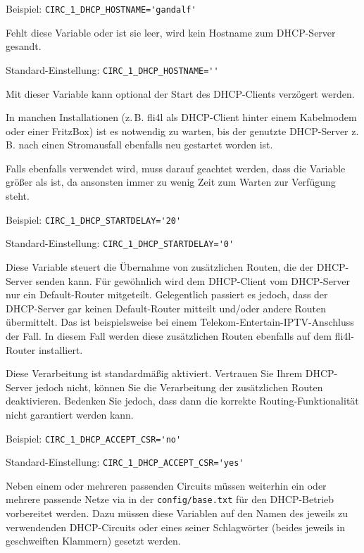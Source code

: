 \begin{description}
Beispiel: \verb+CIRC_1_DHCP_HOSTNAME='gandalf'+

Fehlt diese Variable oder ist sie leer, wird kein Hostname zum DHCP-Server
gesandt.

Standard-Einstellung: \verb+CIRC_1_DHCP_HOSTNAME=''+


Mit dieser Variable kann optional der Start des DHCP-Clients verzögert werden.

In manchen Installationen (z.\,B. fli4l als DHCP-Client hinter einem Kabelmodem
oder einer FritzBox) ist es notwendig zu warten, bis der genutzte DHCP-Server
z.\,B. nach einen Stromausfall ebenfalls neu gestartet worden ist.

Falls  ebenfalls verwendet wird, muss darauf geachtet werden,
dass die Variable  größer als 
ist, da ansonsten immer zu wenig Zeit zum Warten zur Verfügung steht.

Beispiel: \verb+CIRC_1_DHCP_STARTDELAY='20'+

Standard-Einstellung: \verb+CIRC_1_DHCP_STARTDELAY='0'+


Diese Variable steuert die Übernahme von zusätzlichen Routen, die der
DHCP-Server senden kann. Für gewöhnlich wird dem DHCP-Client vom DHCP-Server
nur ein Default-Router mitgeteilt. Gelegentlich passiert es jedoch, dass der
DHCP-Server gar keinen Default-Router mitteilt und/oder andere Routen
übermittelt. Das ist beispielsweise bei einem Telekom-Entertain-IPTV-Anschluss
der Fall. In diesem Fall werden diese zusätzlichen Routen ebenfalls auf dem
fli4l-Router installiert.

Diese Verarbeitung ist standardmäßig aktiviert. Vertrauen Sie Ihrem DHCP-Server
jedoch nicht, können Sie die Verarbeitung der zusätzlichen Routen deaktivieren.
Bedenken Sie jedoch, dass dann die korrekte Routing-Funktionalität nicht
garantiert werden kann.

Beispiel: \verb+CIRC_1_DHCP_ACCEPT_CSR='no'+

Standard-Einstellung: \verb+CIRC_1_DHCP_ACCEPT_CSR='yes'+
\end{description}

Neben einem oder mehreren passenden Circuits müssen weiterhin ein oder mehrere
passende Netze via  in der \texttt{config/base.txt} für den
DHCP-Betrieb vorbereitet werden. Dazu müssen diese Variablen auf den Namen des
jeweils zu verwendenden DHCP-Circuits oder eines seiner Schlagwörter (beides
jeweils in geschweiften Klammern) gesetzt werden.

